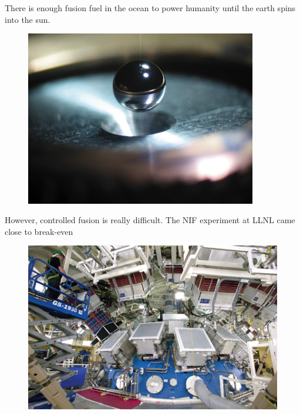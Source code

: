 \documentclass{beamer}
\begin{document}
        \begin{frame}{There is enough fusion fuel in the ocean to power humanity until the earth spins into the sun.}
            \begin{figure}
                \centering
                \includegraphics[width=0.9\textwidth]{./img/lifeFuel.png}
                \caption*{}
            \end{figure}
        \end{frame}

        \begin{frame}{However, controlled fusion is really difficult.  The NIF experiment at LLNL came close to break-even}
            \begin{figure}
                \centering
                \includegraphics[width=1.0\textwidth]{./img/nifChamber.png}
                \caption*{}
            \end{figure}
        \end{frame}
\end{document}

